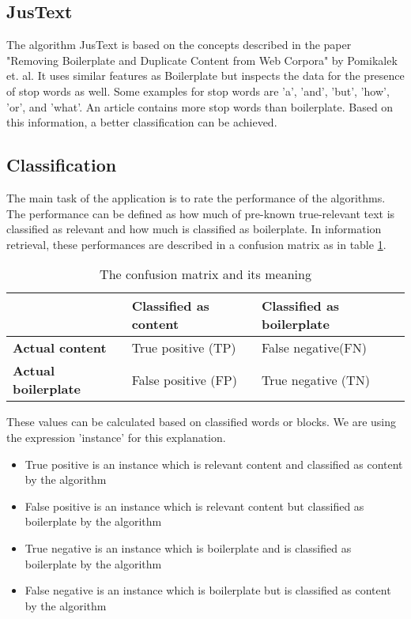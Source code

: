  \subsection{JusText}

The algorithm JusText \cite{algo:justext} is based on the concepts described in the paper "Removing Boilerplate and Duplicate Content from Web Corpora" \cite{paper:justext} by Pomikalek et. al. It uses similar features as Boilerplate but inspects the data for the presence of stop words as well. Some examples for stop words are 'a', 'and', 'but', 'how', 'or', and 'what'. An article contains more stop words than boilerplate. Based on this information, a better classification can be achieved.

\subsection{Classification}

The main task of the application is to rate the performance of the algorithms. The performance can be defined as how much of pre-known true-relevant text is classified as relevant and how much is classified as boilerplate. In information retrieval, these performances are described in a confusion matrix as in table \ref{confusionMatrix}. 

\begin{table}[!ht]
\begin{tabular}{|p{4cm} |p{5.5cm} |p{5.5cm} |}\hline
          								& \textbf{Classified as content} 	& \textbf{Classified as boilerplate} 	\\ \hline
\textbf{Actual content} 				& True positive (TP)				& False negative(FN)					\\ \hline
\textbf{Actual boilerplate} 			& False positive (FP)       		& True negative (TN)				 	\\ \hline
\end{tabular}
\caption{The confusion matrix and its meaning}
\label{confusionMatrix}
\end{table}

These values can be calculated based on classified words or blocks. We are using the expression 'instance' for this explanation.

\begin{itemize}
\item True positive is an instance which is relevant content and classified as content by the algorithm
\item False positive is an instance which is relevant content but classified as boilerplate by the algorithm 
\item True negative is an instance which is boilerplate and is classified as boilerplate by the algorithm
\item False negative is an instance which is boilerplate but is classified as content by the algorithm
\end{itemize}


